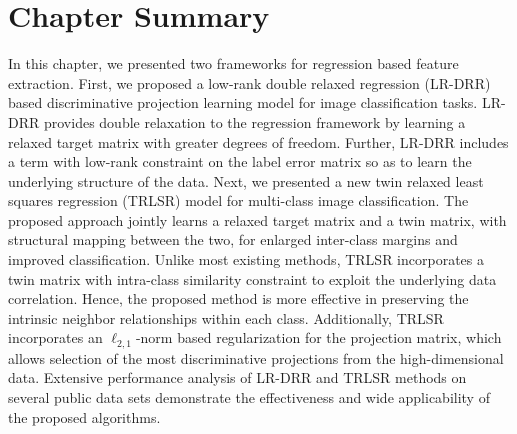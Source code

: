 \section{Chapter Summary}
\label{sec: TRLSR_conclusion}
%
In this chapter, we presented two frameworks for regression based feature extraction. First, we proposed a low-rank double relaxed regression (LR-DRR) based discriminative projection learning model for image classification tasks. LR-DRR provides double relaxation to the regression framework by learning a relaxed target matrix with greater degrees of freedom.  Further, LR-DRR includes a term with low-rank constraint on the label error matrix so as to learn the underlying structure of the data. Next, we presented a new twin relaxed least squares regression (TRLSR) model for multi-class image classification. The proposed approach jointly learns a relaxed target matrix and a twin matrix, with structural mapping between the two, for enlarged inter-class margins and improved classification. Unlike most existing methods, TRLSR incorporates a twin matrix with intra-class similarity constraint to exploit the underlying data correlation. Hence, the proposed method is more effective in preserving the intrinsic neighbor relationships within each class. Additionally, TRLSR incorporates an $\ell_{2,1}$-norm based regularization for the projection matrix, which allows selection of the most discriminative projections from the high-dimensional data. Extensive performance analysis of LR-DRR and TRLSR methods on several public data sets demonstrate the effectiveness and wide applicability of the proposed algorithms.
%